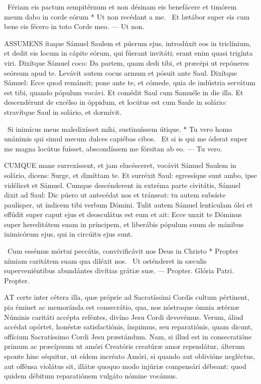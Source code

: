 \R\ Fériam eis pactum sempitérnum et non désinam eis benefácere et timórem meum dabo in corde eórum * Ut non recédant a me. \V\ Et lætábor super eis cum bene eis fécero in toto Corde meo. --- Ut non.


\lettrine[lines=2]{A}{SSUMENS} ítaque Sámuel Saulem et púerum ejus, introdúxit eos in triclínium, et dedit eis locum in cápite eórum, qui fúerant invitáti; erant enim quasi trigínta viri. Dixítque Sámuel coco: Da partem, quam dedi tibi, et præcépi ut repóneres seórsum apud te. Levávit autem cocus armum et pósuit ante Saul. Dixítque Sámuel: Ecce quod remánsit; pone ante te, et cómede, quia de indústria servátum est tibi, quando pópulum vocávi. Et comédit Saul cum Samuéle in die illa. Et descendérunt de excélso in óppidum, et locútus est cum Saule in solário: stravítque Saul in solário, et dormívit.

\R\ Si inimícus meus maledixísset mihi, sustinuíssem útique. * Tu vero homo unánimis qui simul mecum dulces capiébas cibos. \V\ Et si is qui me óderat super me magna locútus fuísset, abscondíssem me fórsitan ab eo. --- Tu vero.


\lettrine[lines=2]{C}{UMQUE} mane surrexíssent, et jam elucésceret, vocávit Sámuel Saulem in solário, dicens: Surge, et dimíttam te. Et surréxit Saul: egressíque sunt ambo, ipse vidélicet et Sámuel. Cumque descénderent in extréma parte civitátis, Sámuel dixit ad Saul: Dic púero ut antecédat nos et tránseat: tu autem subsíste paulísper, ut índicem tibi verbum Dómini. Tulit autem Sámuel lentículam ólei et effúdit super caput ejus et deosculátus est eum et ait: Ecce unxit te Dóminus super hereditátem suam in príncipem, et liberábis pópulum suum de mánibus inimicórum ejus, qui in circúitu ejus sunt.

\R\ Cum essémus mórtui peccátis, convivificávit nos Deus in Christo * Propter nímiam caritátem suam qua diléxit nos. \V\ Ut osténderet in sæculis superveniéntibus abundántes divítias grátiæ suæ. --- Propter. Glória Patri. Propter.




\lettrine[lines=2]{A}{T} certe inter cétera illa, quæ próprie ad Sacratíssimi Cordis cultum pértinent, pia éminet ac memoránda est consecrátio, qua, nos nóstraque ómnia ætérnæ Núminis caritáti accépta reféntes, divíno Jesu Cordi devovémus. Verum, áliud accédat opórtet, honéstæ satisfactiónis, ínquimus, seu reparatiónis, quam dicunt, offícium Sacratíssimo Cordi Jesu præstándum. Nam, si illud est in consecratióne primum ac præcípuum ut amóri Creatóris creatúræ amor rependátur, álterum sponte hinc séquitur, ut eídem incréato Amóri, si quando aut oblivióne negléctus, aut offénsa violátus sit, illátæ quoquo modo injúriæ compensári débeant: quod quidem débitum reparatiónem vulgáto nómine vocámus.

